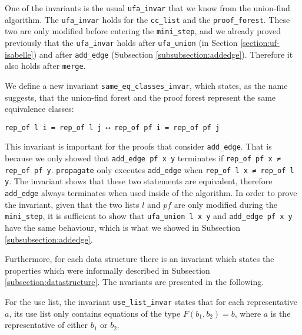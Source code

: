 One of the invariants is the usual \lstinline{ufa_invar} that we know from the union-find algorithm. The \lstinline{ufa_invar} holds for the \lstinline{cc_list} and the \lstinline{proof_forest}. These two are only modified before entering the \lstinline{mini_step}, and we already proved previously that the \lstinline{ufa_invar} holds after \lstinline{ufa_union} (in Section \ref{section:uf-isabelle}) and after \lstinline{add_edge} (Subsection \ref{subsubsection:addedge}). Therefore it also holds after \lstinline{merge}.

We define a new invariant \lstinline{same_eq_classes_invar}, which states, as the name suggests, that the union-find forest and the proof forest represent the same equivalence classes:

\begin{lstlisting}
rep_of l i = rep_of l j ⟷ rep_of pf i = rep_of pf j
\end{lstlisting}

This invariant is important for the proofs that consider \lstinline{add_edge}. That is because we only showed that \lstinline{add_edge pf x y} terminates if \lstinline{rep_of pf x ≠ rep_of pf y}. \lstinline{propagate} only executes \lstinline{add_edge} when \lstinline{rep_of l x ≠ rep_of l y}. The invariant shows that these two statements are equivalent, therefore \lstinline{add_edge} always terminates when used inside of the algorithm.
In order to prove the invariant, given that the two lists $l$ and $pf$ are only modified during the \lstinline{mini_step}, it is sufficient to show that \lstinline{ufa_union l x y} and \lstinline{add_edge pf x y} have the same behaviour, which is what we showed in Subsection \ref{subsubsection:addedge}.

Furthermore, for each data structure there is an invariant which states the properties which were informally described in Subsection \ref{subsection:datastructure}. The nvariants are presented in the following.

For the use list, the invariant \lstinline|use_list_invar| states that for each representative $a$, its use list only contains equations of the type $F(b_1, b_2) = b$, where $a$ is the representative of either $b_1$ or $b_2$.

